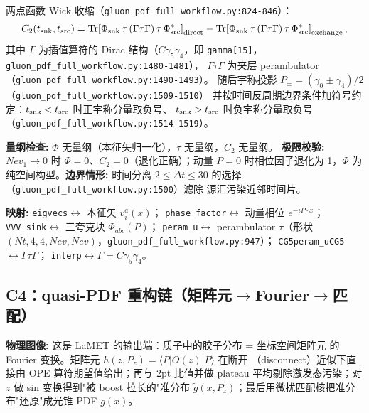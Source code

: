 \documentclass[UTF8]{ctexart}
\begin{document}
两点函数 Wick 收缩（\texttt{\nolinkurl{gluon\_pdf\_full\_workflow.py:824-846}}）：
\begin{equation}\label{eq:wick}
C_2(t_{\rm snk},t_{\rm src}) =
\mathrm{Tr}\!\left[\Phi_{\rm snk}\,\tau\,(\Gamma\tau\Gamma)\,\tau\,\Phi_{\rm src}^*\right]_{\rm direct}
-
\mathrm{Tr}\!\left[\Phi_{\rm snk}\,\tau\,(\Gamma\tau\Gamma)\,\tau\,\Phi_{\rm src}^*\right]_{\rm exchange},
\end{equation}
其中 $\Gamma$ 为插值算符的 Dirac 结构（$C\gamma_5\gamma_4$，即
\texttt{gamma[15]}，\texttt{\nolinkurl{gluon\_pdf\_full\_workflow.py:1480-1481}}），
$\Gamma\tau\Gamma$ 为夹层 perambulator（\texttt{\nolinkurl{gluon\_pdf\_full\_workflow.py:1490-1493}}）。
随后宇称投影 $P_{\pm} = (\gamma_0\pm\gamma_4)/2$（\texttt{\nolinkurl{gluon\_pdf\_full\_workflow.py:1509-1510}}）
并按时间反周期边界条件加符号约定：$t_{\rm snk}<t_{\rm src}$ 时正宇称分量取负号、
$t_{\rm snk}>t_{\rm src}$ 时负宇称分量取负号（\texttt{\nolinkurl{gluon\_pdf\_full\_workflow.py:1514-1519}}）。

\textbf{量纲检查:} $\Phi$ 无量纲（本征矢归一化），$\tau$ 无量纲，$C_2$ 无量纲。
\textbf{极限校验:} $Nev_1\to0$ 时 $\Phi=0$、$C_2=0$（退化正确）；动量 $P=0$
时相位因子退化为 1，$\Phi$ 为纯空间构型。\textbf{边界情形:} 时间分离
$2\le\Delta t\le30$ 的选择（\texttt{\nolinkurl{gluon\_pdf\_full\_workflow.py:1500}}）滤除
源汇污染近邻时间片。

\begin{mapbox}
\textbf{映射:} \texttt{eigvecs}$\leftrightarrow$ 本征矢 $v^a_i(x)$；
\texttt{phase\_factor}$\leftrightarrow$ 动量相位 $e^{-iP\cdot x}$；
\texttt{VVV\_sink}$\leftrightarrow$ 三夸克块 $\Phi_{abc}(P)$；
\texttt{peram\_u}$\leftrightarrow$ perambulator $\tau$（形状
$(Nt,4,4,Nev,Nev)$，\texttt{\nolinkurl{gluon\_pdf\_full\_workflow.py:947}}）；
\texttt{CG5peram\_uCG5}$\leftrightarrow\Gamma\tau\Gamma$；
\texttt{interp}$\leftrightarrow\Gamma=C\gamma_5\gamma_4$。
\end{mapbox}

\subsection{C4：quasi-PDF 重构链（矩阵元$\to$Fourier$\to$匹配）}

\begin{physbox}
\textbf{物理图像:} 这是 LaMET 的输出端：质子中的胶子分布 = 坐标空间矩阵元
的 Fourier 变换。矩阵元 $h(z,P_z)=\langle P|O(z)|P\rangle$ 在断开
（disconnect）近似下直接由 OPE 算符期望值给出；再与 2pt 比值并做 plateau
平均剔除激发态污染；对 $z$ 做 sin 变换得到"被 boost 拉长的"准分布
$\tilde g(x,P_z)$；最后用微扰匹配核把准分布"还原"成光锥 PDF $g(x)$。
\end{physbox}
\end{document}

